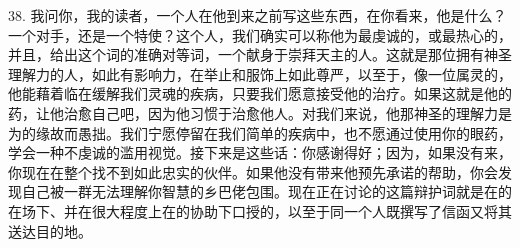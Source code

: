 38. 我问你，我的读者，一个人在他到来之前写这些东西，在你看来，他是什么？一个对手，还是一个特使？这个人，我们确实可以称他为最虔诚的，或最热心的，并且，给出这个词的准确对等词，一个献身于崇拜天主的人。这就是那位拥有神圣理解力的人，如此有影响力，在举止和服饰上如此尊严，以至于，像一位属灵的，他能藉着临在缓解我们灵魂的疾病，只要我们愿意接受他的治疗。如果这就是他的药，让他治愈自己吧，因为他习惯于治愈他人。对我们来说，他那神圣的理解力是为的缘故而愚拙。我们宁愿停留在我们简单的疾病中，也不愿通过使用你的眼药，学会一种不虔诚的滥用视觉。接下来是这些话：你感谢得好；因为，如果没有来，你现在在整个找不到如此忠实的伙伴。如果他没有带来他预先承诺的帮助，你会发现自己被一群无法理解你智慧的乡巴佬包围。现在正在讨论的这篇辩护词就是在的在场下、并在很大程度上在的协助下口授的，以至于同一个人既撰写了信函又将其送达目的地。\par

